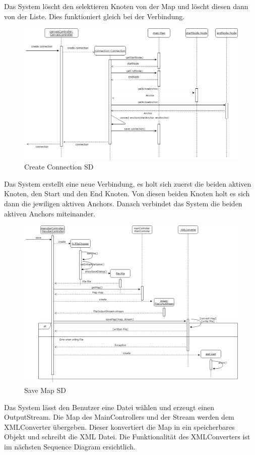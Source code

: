 Das System löscht den selektieren Knoten von der Map und löscht diesen dann von der Liste. 
Dies funktioniert gleich bei der Verbindung.

\begin{figure}[H]
	\centering
		\includegraphics[scale=0.6]{images/connectionSD.PNG}
	\caption{Create Connection SD}
	\label{fig:create_connection_SD}
\end{figure}
Das System erstellt eine neue Verbindung, es holt sich zuerst die beiden aktiven Knoten, den Start 
und den End Knoten. Von diesen beiden Knoten holt es sich dann die jewiligen aktiven Anchors. Danach
verbindet das System die beiden aktiven Anchors miteinander.

\begin{figure}[H]
	\centering
		\includegraphics[scale=0.4]{images/savemapSD.png}
	\caption{Save Map SD}
	\label{fig:savemap_SD}
\end{figure}
Das System lässt den Benutzer eine Datei wählen und erzeugt einen OutputStream. Die Map des MainControllers und der Stream werden dem XMLConverter übergeben. Dieser konvertiert die Map in ein speicherbares Objekt und schreibt die XML Datei. Die Funktionalität des XMLConverters ist im nächsten Sequence Diagram ersichtlich.

